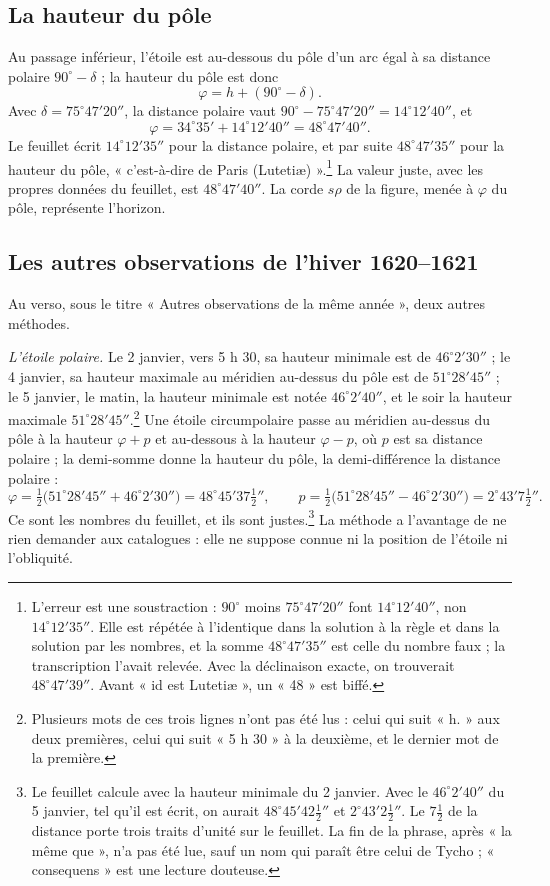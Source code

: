 \documentclass[11pt,a4paper]{article}
\begin{document}
\subsection*{La hauteur du pôle}

Au passage inférieur, l'étoile est au-dessous du pôle d'un arc égal à sa
distance polaire $90^\circ - \delta$ ; la hauteur du pôle est donc
\[
\varphi = h + (90^\circ - \delta).
\]
Avec $\delta = 75^\circ 47' 20''$, la distance polaire vaut
$90^\circ - 75^\circ 47' 20'' = 14^\circ 12' 40''$, et
\[
\varphi = 34^\circ 35' + 14^\circ 12' 40'' = 48^\circ 47' 40''.
\]
Le feuillet écrit $14^\circ 12' 35''$ pour la distance polaire, et par suite
$48^\circ 47' 35''$ pour la hauteur du pôle, « c'est-à-dire de Paris
(Lutetiæ) ».\footnote{L'erreur est une soustraction : $90^\circ$ moins
$75^\circ 47' 20''$ font $14^\circ 12' 40''$, non $14^\circ 12' 35''$. Elle est
répétée à l'identique dans la solution à la règle et dans la solution par les
nombres, et la somme $48^\circ 47' 35''$ est celle du nombre faux ; la
transcription l'avait relevée. Avec la déclinaison exacte, on trouverait
$48^\circ 47' 39''$. Avant « id est Lutetiæ », un « 48 » est biffé.} La valeur
juste, avec les propres données du feuillet, est $48^\circ 47' 40''$. La corde
$s\rho$ de la figure, menée à $\varphi$ du pôle, représente l'horizon.

\subsection*{Les autres observations de l'hiver 1620--1621}

Au verso, sous le titre « Autres observations de la même année », deux autres
méthodes.

\emph{L'étoile polaire.} Le 2 janvier, vers 5 h 30, sa hauteur minimale
est de $46^\circ 2' 30''$ ; le 4 janvier, sa hauteur maximale au méridien au-dessus
du pôle est de $51^\circ 28' 45''$ ; le 5 janvier, le matin, la hauteur minimale
est notée $46^\circ 2' 40''$, et le soir la hauteur maximale
$51^\circ 28' 45''$.\footnote{Plusieurs mots de ces trois lignes n'ont pas été
lus : celui qui suit « h. » aux deux premières, celui qui suit « 5 h 30 »
à la deuxième, et le dernier mot de la première.} Une étoile circumpolaire
passe au méridien au-dessus du pôle à la hauteur $\varphi + p$ et au-dessous à
la hauteur $\varphi - p$, où $p$ est sa distance polaire ; la demi-somme donne
la hauteur du pôle, la demi-différence la distance polaire :
\[
\varphi = \tfrac12\bigl(51^\circ 28' 45'' + 46^\circ 2' 30''\bigr) = 48^\circ 45' 37\tfrac12'',
\qquad
p = \tfrac12\bigl(51^\circ 28' 45'' - 46^\circ 2' 30''\bigr) = 2^\circ 43' 7\tfrac12''.
\]
Ce sont les nombres du feuillet, et ils sont justes.\footnote{Le feuillet
calcule avec la hauteur minimale du 2 janvier. Avec le $46^\circ 2' 40''$ du 5
janvier, tel qu'il est écrit, on aurait $48^\circ 45' 42\tfrac12''$ et
$2^\circ 43' 2\tfrac12''$. Le $7\tfrac12$ de la distance porte trois traits
d'unité sur le feuillet. La fin de la phrase, après « la même que », n'a pas
été lue, sauf un nom qui paraît être celui de Tycho ; « consequens » est une
lecture douteuse.} La méthode a l'avantage de ne rien demander aux
catalogues : elle ne suppose connue ni la position de l'étoile ni
l'obliquité.
\end{document}
